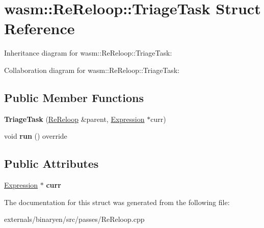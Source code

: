 \hypertarget{structwasm_1_1_re_reloop_1_1_triage_task}{}\section{wasm\+:\+:Re\+Reloop\+:\+:Triage\+Task Struct Reference}
\label{structwasm_1_1_re_reloop_1_1_triage_task}


Inheritance diagram for wasm\+:\+:Re\+Reloop\+:\+:Triage\+Task\+:


Collaboration diagram for wasm\+:\+:Re\+Reloop\+:\+:Triage\+Task\+:
\subsection*{Public Member Functions}
\begin{DoxyCompactItemize}
\item 
\mbox{\label{structwasm_1_1_re_reloop_1_1_triage_task_ab837757b3bd071729e339b5ab108c066}} 
{\bfseries Triage\+Task} (\mbox{\hyperlink{structwasm_1_1_re_reloop}{Re\+Reloop}} \&parent, \mbox{\hyperlink{classwasm_1_1_expression}{Expression}} $\ast$curr)
\item 
\mbox{\label{structwasm_1_1_re_reloop_1_1_triage_task_af30aad7af0d10b3c92fd7469dba2ff9c}} 
void {\bfseries run} () override
\end{DoxyCompactItemize}
\subsection*{Public Attributes}
\begin{DoxyCompactItemize}
\item 
\mbox{\label{structwasm_1_1_re_reloop_1_1_triage_task_a2effda74d83543b0453e6889445f2ba1}} 
\mbox{\hyperlink{classwasm_1_1_expression}{Expression}} $\ast$ {\bfseries curr}
\end{DoxyCompactItemize}


The documentation for this struct was generated from the following file\+:\begin{DoxyCompactItemize}
\item 
externals/binaryen/src/passes/Re\+Reloop.\+cpp\end{DoxyCompactItemize}
